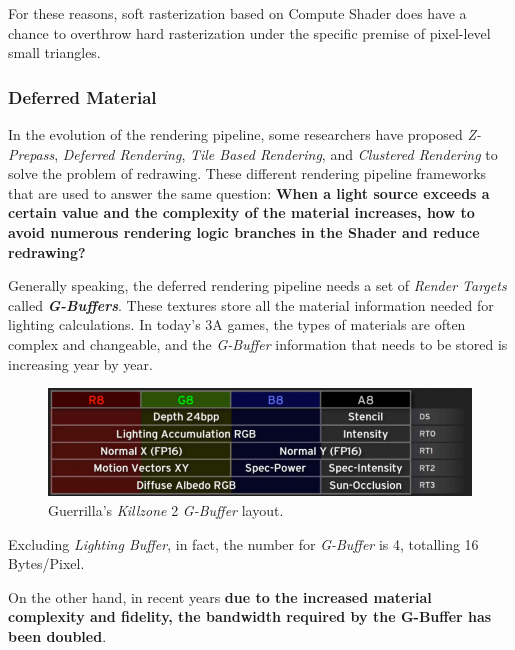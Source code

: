 \documentclass[10pt,journal,compsoc]{IEEEtran}
\begin{document}
\par For these reasons, soft rasterization based on Compute Shader does have a chance to overthrow hard rasterization under the specific premise of pixel-level small triangles.

\subsubsection{Deferred Material}

\par In the evolution of the rendering pipeline, some researchers have proposed \textit{Z-Prepass}, \textit{Deferred Rendering}, \textit{Tile Based Rendering}, and \textit{Clustered Rendering} to solve the problem of redrawing. These different rendering pipeline frameworks that are used to answer the same question: \textbf{When a light source exceeds a certain value and the complexity of the material increases, how to avoid numerous rendering logic branches in the Shader and reduce redrawing?}

\par Generally speaking, the deferred rendering pipeline needs a set of \textit{Render Targets} called \textbf{\textit{G-Buffers}}. These textures store all the material information needed for lighting calculations. In today's 3A games, the types of materials are often complex and changeable, and the \textit{G-Buffer} information that needs to be stored is increasing year by year. 

\begin{figure}[H]
    \centering
    \includegraphics[scale=0.25]{img/gbuffer.png}
    \caption{Guerrilla's \textit{Killzone} 2 \textit{G-Buffer} layout.\cite{killzone}}
    \label{fig:gbuffer1}
\end{figure}

\par Excluding \textit{Lighting Buffer}, in fact, the number for \textit{G-Buffer} is 4, totalling 16 Bytes/Pixel. 

\par On the other hand, in recent years \textbf{due to the increased material complexity and fidelity, the bandwidth required by the G-Buffer has been doubled}.
\end{document}
